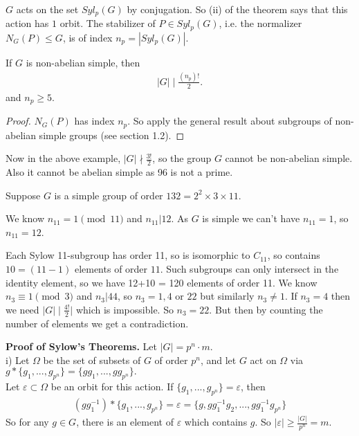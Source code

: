 \documentclass[a4paper]{article}
\begin{document}
$G$ acts on the set $Syl_p(G)$ by conjugation. So (ii) of the theorem says that this action has $1$ orbit. The stabilizer of $P \in Syl_p(G)$, i.e. the normalizer $N_G(P) \leq G$, is of index $n_p = |Syl_p(G)|$.

\begin{coro}
If $G$ is non-abelian simple, then
\begin{equation*}
\begin{aligned}
|G| \mid \frac{(n_p)!}{2}.
\end{aligned}
\end{equation*}
and $n_p \geq 5$.
\begin{proof}
$N_G(P)$ has index $n_p$. So apply the general result about subgroups of non-abelian simple groups (see section 1.2).
\end{proof}
\end{coro}

Now in the above example, $|G| \nmid \frac{3!}{2}$, so the group $G$ cannot be non-abelian simple. Also it cannot be abelian simple as 96 is not a prime.

\begin{eg}
Suppose $G$ is a simple group of order $132=2^2\times 3 \times 11$.

We know $n_{11} = 1 \pmod {11}$ and $n_{11} | 12$. As $G$ is simple we can't have $n_{11} = 1$, so $n_{11} = 12$.

Each Sylow 11-subgroup has order 11, so is isomorphic to $C_{11}$, so contains $10=(11-1)$ elements of order $11$. Such subgroups can only intersect in the identity element, so we have 12+10 = 120 elements of order 11. We know $n_3 \equiv 1 \pmod 3$ and $n_3 | 44$, so $n_3 = 1,4$ or $22$ but similarly $n_3 \neq 1$. If $n_3 = 4$ then we need $|G| \mid \frac{4!}{2}|$ which is impossible. So $n_3 = 22$. But then by counting the number of elements we get a contradiction.
\end{eg}

\textbf{Proof of Sylow's Theorems.} Let $|G| = p^n \cdot m$.\\
i) Let $\Omega$ be the set of subsets of $G$ of order $p^n$, and let $G$ act on $\Omega$ via $g * \{g_1,...,g_{p^n}\} = \{gg_1,...,gg_{p^n}\}.$\\
Let $\varepsilon \subset \Omega$ be an orbit for this action. If $\{g_1,...,g_{p^n}\} = \varepsilon$, then
\begin{equation*}
\begin{aligned}
(gg_1^{-1}) * \{g_1,...,g_{p^n}\} = \varepsilon = \{ g,gg^{-1}_1 g_2,...,gg^{-1}_1 g_{p^n}\}
\end{aligned}
\end{equation*}
So for any $g \in G$, there is an element of $\varepsilon$ which contains $g$. So $|\varepsilon| \geq \frac{|G|}{p^n} = m$.
\end{document}
